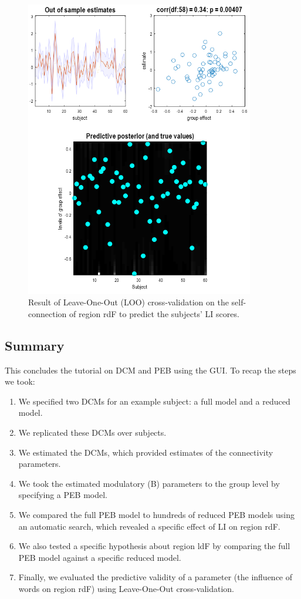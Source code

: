 \documentclass{article}
\begin{document}
\begin{figure}[ht]
\begin{center}
\includegraphics[width=10cm]{"Fig_peb_loo_gui"}
\caption{Result of Leave-One-Out (LOO) cross-validation on the self-connection of region rdF to predict the subjects' LI scores.\label{Fig_peb_loo_gui}}
\end{center}
\end{figure}

\subsection{Summary} \label{GUI_summary}
This concludes the tutorial on DCM and PEB using the GUI. To recap the steps we took:
\begin{enumerate}
    \item We specified two DCMs for an example subject: a full model and a reduced model.
    \item We replicated these DCMs over subjects.
    \item We estimated the DCMs, which provided estimates of the connectivity parameters.
    \item We took the estimated modulatory (B) parameters to the group level by specifying a PEB model.
    \item We compared the full PEB model to hundreds of reduced PEB models using an automatic search, which revealed a specific effect of LI on region rdF.
    \item We also tested a specific hypothesis about region ldF by comparing the full PEB model against a specific reduced model.
    \item Finally, we evaluated the predictive validity of a parameter (the influence of words on region rdF) using Leave-One-Out cross-validation.
\end{enumerate}
\end{document}

